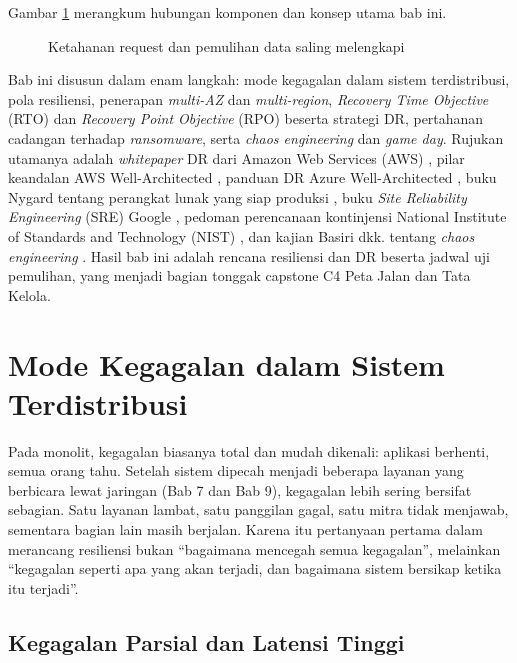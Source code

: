 Gambar \ref{fig:ch12-ilustrasi} merangkum hubungan komponen dan konsep utama bab ini.
\begin{figure}[!htb]
  \centering
  
  \caption{Ketahanan request dan pemulihan data saling melengkapi}
  \label{fig:ch12-ilustrasi}
\end{figure}

Bab ini disusun dalam enam langkah: mode kegagalan dalam sistem terdistribusi, pola resiliensi,
penerapan \textit{multi-AZ} dan \textit{multi-region}, \textit{Recovery Time Objective} (RTO) dan
\textit{Recovery Point Objective} (RPO) beserta strategi DR, pertahanan cadangan terhadap
\textit{ransomware}, serta \textit{chaos engineering} dan \textit{game day}. Rujukan utamanya adalah
\textit{whitepaper} DR dari Amazon Web Services (AWS) \cite{c12-aws-dr2021}, pilar keandalan AWS
Well-Architected \cite{c12-aws-reliability}, panduan DR Azure Well-Architected \cite{c12-azure-dr},
buku Nygard tentang perangkat lunak yang siap produksi \cite{c12-nygard2018}, buku
\textit{Site Reliability Engineering} (SRE) Google \cite{beyer2016}, pedoman perencanaan kontinjensi
National Institute of Standards and Technology (NIST) \cite{c12-nist800-34}, dan kajian Basiri dkk.
tentang \textit{chaos engineering} \cite{c12-basiri2016}. Hasil bab ini adalah rencana resiliensi
dan DR beserta jadwal uji pemulihan, yang menjadi bagian tonggak capstone C4 Peta Jalan dan Tata
Kelola.

\section{Mode Kegagalan dalam Sistem Terdistribusi}
\label{sec:ch12-mode-kegagalan}

Pada monolit, kegagalan biasanya total dan mudah dikenali: aplikasi berhenti, semua orang tahu.
Setelah sistem dipecah menjadi beberapa layanan yang berbicara lewat jaringan (Bab 7 dan Bab 9),
kegagalan lebih sering bersifat sebagian. Satu layanan lambat, satu panggilan gagal, satu mitra
tidak menjawab, sementara bagian lain masih berjalan. Karena itu pertanyaan pertama dalam merancang
resiliensi bukan ``bagaimana mencegah semua kegagalan'', melainkan ``kegagalan seperti apa yang
akan terjadi, dan bagaimana sistem bersikap ketika itu terjadi''.

\subsection{Kegagalan Parsial dan Latensi Tinggi}

